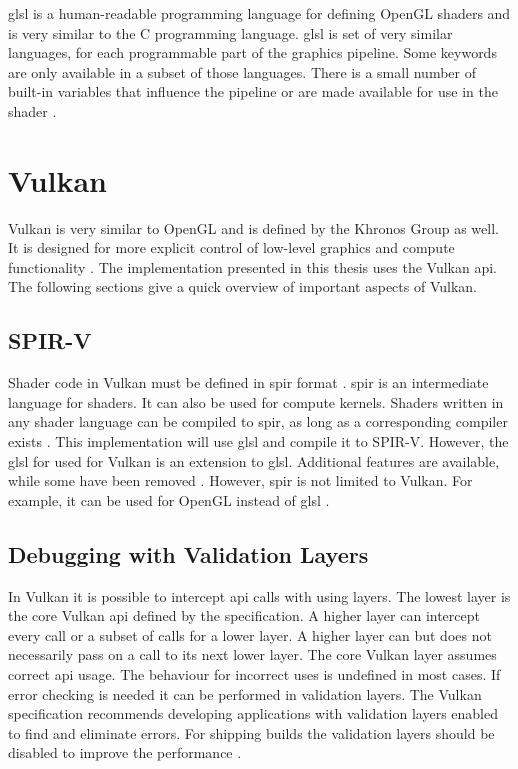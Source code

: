 \Gls{glsl} is a human-readable programming language for defining OpenGL shaders and is very similar to the C programming language. \Gls{glsl} is set of very similar languages, for each programmable part of the graphics pipeline. Some keywords are only available in a subset of those languages. There is a small number of built-in variables that influence the pipeline or are made available for use in the shader \cite{khronos:glsl4.60:spec}.


\section{Vulkan}
Vulkan is very similar to OpenGL and is defined by the Khronos Group as well. It is designed for more explicit control of low-level graphics and compute functionality \cite{khronos:vulkan:spec1.1}. The implementation presented in this thesis uses the Vulkan \gls{api}. The following sections give a quick overview of important aspects of Vulkan.

\subsection{SPIR-V}

Shader code in Vulkan must be defined in \gls{spir} format \cite{khronos:vulkan:spec1.1}. \Gls{spir} is an intermediate language for shaders. It can also be used for compute kernels. Shaders written in any shader language can be compiled to \gls{spir}, as long as a corresponding compiler exists \cite{kessenich:2018:spir}. This implementation will use \gls{glsl} and compile it to SPIR-V. However, the \gls{glsl} for used for Vulkan is an extension to \gls{glsl}. Additional features are available, while some have been removed \cite{khronos:vulkan:glsl}. However, \gls{spir} is not limited to Vulkan. For example, it can be used for OpenGL instead of \gls{glsl} \cite{khronos:glsl4.60:spec}.

\subsection{Debugging with Validation Layers}

In Vulkan it is possible to intercept \gls{api} calls with using layers. The lowest layer is the core Vulkan \gls{api} defined by the specification. A higher layer can intercept every call or a subset of calls for a lower layer. A higher layer can but does not necessarily pass on a call to its next lower layer. The core Vulkan layer assumes correct \gls{api} usage. The behaviour for incorrect uses is undefined in most cases. If error checking is needed it can be performed in validation layers. The Vulkan specification recommends developing applications with validation layers enabled to find and eliminate errors. For shipping builds the validation layers should be disabled to improve the performance \cite{khronos:vulkan:spec1.1}.


